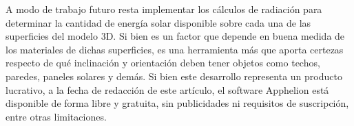 \documentclass[a4paper]{article}
\begin{document}
A modo de trabajo futuro resta implementar los cálculos de radiación para determinar la cantidad de energía solar disponible sobre cada una de las superficies del modelo 3D. Si bien es un factor que depende en buena medida de los materiales de dichas superficies, es una herramienta más que aporta certezas respecto de qué inclinación y orientación deben tener objetos como techos, paredes, paneles solares y demás. Si bien este desarrollo representa un producto lucrativo, a la fecha de redacción de este artículo, el software Apphelion está disponible de forma libre y gratuita, sin publicidades ni requisitos de suscripción, entre otras limitaciones.



\end{document}
